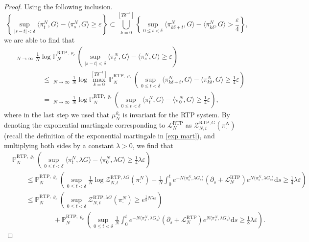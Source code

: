 \documentclass[11pt]{article}
\numberwithin{equation}{section}
\DeclareMathOperator*\uplim{\overline{lim}}
\theoremstyle{definition}
\theoremstyle{plain}
\newcommand{\p}{\mathbb{P}}
\newcommand{\dd}{\mathrm{d}}
\newcommand{\nn}{\nonumber}
\newcommand{\RTP}{\mathrm{RTP}}
\begin{document}
\begin{proof}
Using the following inclusion.
    \begin{equation}\label{contain}
        \left\{ \sup_{|s-t|<\delta} \langle\pi^N_{t}, G\rangle - \langle\pi^N_{s}, G\rangle \geq \varepsilon\right\} \subset \bigcup_{k=0}^{[T\delta^{-1}]} \left\{\sup_{0\leq t<\delta } \langle\pi^N_{k\delta + t}, G\rangle - \langle\pi^N_{k\delta}, G\rangle >\frac{\varepsilon}{4}\right\},
    \end{equation}   
we are able to find that 
    \begin{align}
        &\nn\uplim_{N\to\infty} \frac{1}{N}\log \p^{\RTP,\varrho_c}_N\left(\sup_{|s-t|<\delta} \langle\pi^N_{t}, G\rangle - \langle\pi^N_{s}, G\rangle  \geq \varepsilon \right)\\
        \nn&\qquad \qquad \leq  \uplim_{N\to\infty} \frac{1}{N}\log \max_{k=0}^{[T\delta^{-1}]} \p^{\RTP,\varrho_c}_N\left(\sup_{0\leq t<\delta } \langle\pi^N_{k\delta + t}, G\rangle - \langle\pi^N_{k\delta}, G\rangle  \geq \tfrac{1}{4}\varepsilon \right)\\
        &\qquad \qquad = \uplim_{N\to\infty} \frac{1}{N}\log  \p^{\RTP,\varrho_c}_N\left(\sup_{0\leq t<\delta }  \langle\pi^N_{t}, G\rangle - \langle\pi^N_{0}, G\rangle \geq \tfrac{1}{4}\varepsilon \right),
    \end{align}
where in the last step we used  that $\mu^{\varrho_c}_N$ is invariant for the RTP system. 
By denoting the exponential martingale corresponding to $\mathscr{L}^{\RTP}_N$ as $\mathcal{Z}^{\RTP, G}_{N,t}(\pi^N_{\cdot})$ (recall the definition of the exponential martingale in \eqref{exp mart}), and multiplying both sides by a constant $\lambda>0$, we find that
    \begin{align}
        &\nn\p^{\RTP,\varrho_c}_N\left(\sup_{0\leq t<\delta }  \langle\pi^N_{ t}, \lambda G\rangle - \langle\pi^N_{0}, \lambda G\rangle\geq \tfrac{1}{4}\lambda \varepsilon \right)\\
        &\nn \qquad \leq \p^{\RTP,\varrho_c}_N\left(\sup_{0\leq t<\delta } \frac{1}{N}\log \mathcal{Z}^{\RTP, \lambda G}_{N,t}(\pi^N_{\cdot}) + \frac{1}{N}\int_{0}^{t} e^{-N\langle \pi^N_{s},\lambda G_s\rangle}(\partial_s + \mathscr{L}^{\RTP}_N) e^{N\langle \pi^N_{s},\lambda G_s\rangle} \dd s \geq \tfrac{1}{4}\lambda \varepsilon \right)\\
        \nn&\qquad \leq \p^{\RTP,\varrho_c}_N\left(\sup_{0\leq t<\delta } \mathcal{Z}^{\RTP,\lambda G}_{N,t}(\pi^N_{\cdot}) \geq e^{\frac{1}{8}N\lambda \varepsilon}\right)\\
        &\qquad \qquad \qquad +\p^{\RTP,\varrho_c}_N\left( \sup_{0\leq t < \delta}\frac{1}{N}\int_{0}^{ t} e^{-N\langle \pi^N_{s},\lambda G_s\rangle}(\partial_s + \mathscr{L}^{\RTP}_N) e^{N\langle \pi^N_{s},\lambda G_s\rangle} \dd s \geq \tfrac{1}{8}\lambda \varepsilon \right).

\end{align}
\end{proof}
\end{document}
